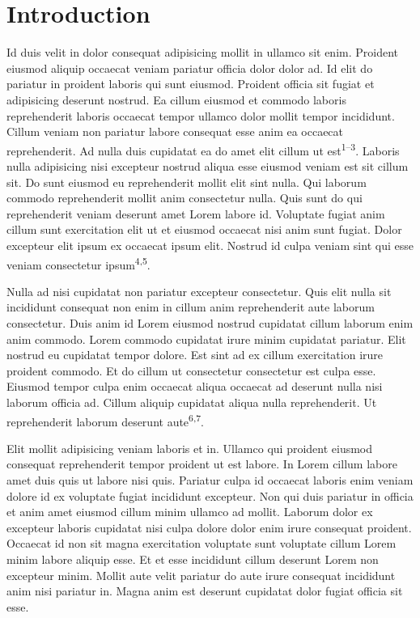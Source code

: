 \pagebreak

\hypertarget{introduction}{%
\section{Introduction}\label{introduction}}

Id duis velit in dolor consequat adipisicing mollit in ullamco sit enim.
Proident eiusmod aliquip occaecat veniam pariatur officia dolor dolor
ad. Id elit do pariatur in proident laboris qui sunt eiusmod. Proident
officia sit fugiat et adipisicing deserunt nostrud. Ea cillum eiusmod et
commodo laboris reprehenderit laboris occaecat tempor ullamco dolor
mollit tempor incididunt. Cillum veniam non pariatur labore consequat
esse anim ea occaecat reprehenderit. Ad nulla duis cupidatat ea do amet
elit cillum ut est\textsuperscript{1--3}. Laboris nulla adipisicing nisi
excepteur nostrud aliqua esse eiusmod veniam est sit cillum sit. Do sunt
eiusmod eu reprehenderit mollit elit sint nulla. Qui laborum commodo
reprehenderit mollit anim consectetur nulla. Quis sunt do qui
reprehenderit veniam deserunt amet Lorem labore id. Voluptate fugiat
anim cillum sunt exercitation elit ut et eiusmod occaecat nisi anim sunt
fugiat. Dolor excepteur elit ipsum ex occaecat ipsum elit. Nostrud id
culpa veniam sint qui esse veniam consectetur
ipsum\textsuperscript{4,5}.

\setlength{\parskip}{1cm plus4mm minus3mm}

Nulla ad nisi cupidatat non pariatur excepteur consectetur. Quis elit
nulla sit incididunt consequat non enim in cillum anim reprehenderit
aute laborum consectetur. Duis anim id Lorem eiusmod nostrud cupidatat
cillum laborum enim anim commodo. Lorem commodo cupidatat irure minim
cupidatat pariatur. Elit nostrud eu cupidatat tempor dolore. Est sint ad
ex cillum exercitation irure proident commodo. Et do cillum ut
consectetur consectetur est culpa esse. Eiusmod tempor culpa enim
occaecat aliqua occaecat ad deserunt nulla nisi laborum officia ad.
Cillum aliquip cupidatat aliqua nulla reprehenderit. Ut reprehenderit
laborum deserunt aute\textsuperscript{6,7}.

Elit mollit adipisicing veniam laboris et in. Ullamco qui proident
eiusmod consequat reprehenderit tempor proident ut est labore. In Lorem
cillum labore amet duis quis ut labore nisi quis. Pariatur culpa id
occaecat laboris enim veniam dolore id ex voluptate fugiat incididunt
excepteur. Non qui duis pariatur in officia et anim amet eiusmod cillum
minim ullamco ad mollit. Laborum dolor ex excepteur laboris cupidatat
nisi culpa dolore dolor enim irure consequat proident. Occaecat id non
sit magna exercitation voluptate sunt voluptate cillum Lorem minim
labore aliquip esse. Et et esse incididunt cillum deserunt Lorem non
excepteur minim. Mollit aute velit pariatur do aute irure consequat
incididunt anim nisi pariatur in. Magna anim est deserunt cupidatat
dolor fugiat officia sit esse.

